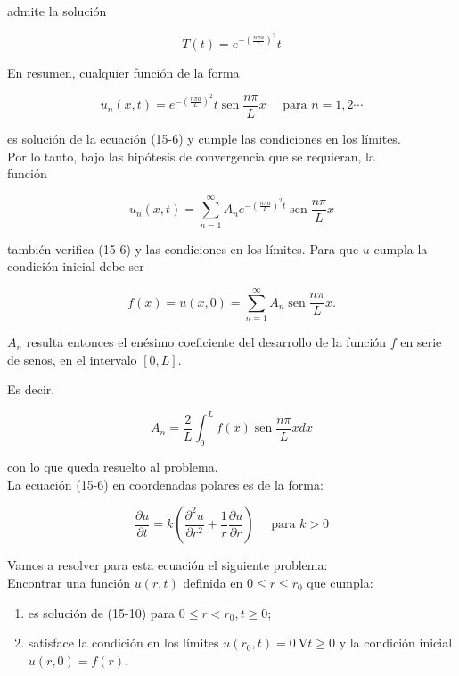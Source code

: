 \documentclass[10pt]{article}
\theoremstyle{plain}
\theoremstyle{definition}
\theoremstyle{remark}
\begin{document}
admite la solución

$$
T(t)=e^{-\left(\frac{n \pi a}{L}\right)^{2}} t
$$

En resumen, cualquier función de la forma

$$
u_{n}(x, t)=e^{-\left(\frac{n \pi a}{L}\right)^{2}} t \operatorname{sen} \frac{n \pi}{L} x \quad \text { para } n=1,2 \cdots
$$

es solución de la ecuación (15-6) y cumple las condiciones en los límites.\\
Por lo tanto, bajo las hipótesis de convergencia que se requieran, la\\
función

$$
u_{n}(x, t)=\sum_{n=1}^{\infty} A_{n} e^{-\left(\frac{n \pi a}{L}\right)^{2} t} \operatorname{sen} \frac{n \pi}{L} x
$$

también verifica (15-6) y las condiciones en los límites. Para que $u$ cumpla la condición inicial debe ser

$$
f(x)=u(x, 0)=\sum_{n=1}^{\infty} A_{n} \operatorname{sen} \frac{n \pi}{L} x .
$$

$A_{n}$ resulta entonces el enésimo coeficiente del desarrollo de la función $f$ en serie de senos, en el intervalo $[0, L]$.

Es decir,

$$
A_{n}=\frac{2}{L} \int_{0}^{L} f(x) \operatorname{sen} \frac{n \pi}{L} x d x
$$

con lo que queda resuelto al problema.\\
La ecuación (15-6) en coordenadas polares es de la forma:


\begin{equation*}
\frac{\partial u}{\partial t}=k\left(\frac{\partial^{2} u}{\partial r^{2}}+\frac{1}{r} \frac{\partial u}{\partial r}\right) \quad \text { para } k>0 \tag{15-10}
\end{equation*}


Vamos a resolver para esta ecuación el siguiente problema:\\
Encontrar una función $u(r, t)$ definida en $0 \leqslant r \leqslant r_{0}$ que cumpla:

\begin{enumerate}
  \item es solución de (15-10) para $0 \leqslant r<r_{0}, t \geqslant 0$;
  \item satisface la condición en los límites $u\left(r_{0}, t\right)=0 \mathrm{~V} t \geqslant 0$ y la condición inicial $u(r, 0)=f(r)$.
\end{enumerate}
\end{document}
